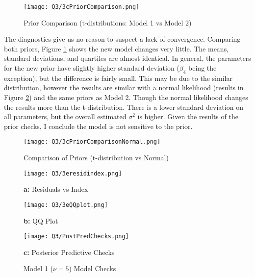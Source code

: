 \documentclass{article}
\begin{document}
\begin{figure}[!h]
\centering
\texttt{[image: Q3/3cPriorComparison.png]} \vspace{-5mm}
\caption{Prior Comparison (t-distributions: Model 1 vs Model 2)} \label{Fig3dPriorComp}
\end{figure}


The diagnostics give us no reason to suspect a lack of convergence. Comparing both priors, Figure \ref{Fig3dPriorComp} shows the new model changes very little. The means, standard deviations, and quartiles are almost identical. In general, the parameters for the new prior have slightly higher standard deviation ($\beta_4$ being the exception), but the difference is fairly small. This may be due to the similar distribution, however the results are similar with a normal likelihood (results in Figure \ref{Fig3dPriorComp2}) and the same priors as Model 2. Though the normal likelihood changes the results more than the t-distribution. There is a lower standard deviation on all parameters, but the overall estimated $\sigma^2$ is higher. Given the results of the prior checks, I conclude the model is not sensitive to the prior. 

\begin{figure}[!h]
\centering
\texttt{[image: Q3/3cPriorComparisonNormal.png]}
\caption{Comparison of Priors (t-distribution vs Normal)} \label{Fig3dPriorComp2}
\end{figure}



\begin{figure}[!h]
    \begin{minipage}[l]{0.5\textwidth}
        \texttt{[image: Q3/3eresidindex.png]}
        \centerline{\textbf{a:} Residuals vs Index}
    \end{minipage}
    \begin{minipage}[pos=r]{0.5\textwidth}
        \texttt{[image: Q3/3eQQplot.png]}
        \centerline{\textbf{b:} QQ Plot}
    \end{minipage}
    
    
    \begin{minipage}[pos=l]{\textwidth}
        \texttt{[image: Q3/PostPredChecks.png]}
        \centerline{\textbf{c:} Posterior Predictive Checks}
    \end{minipage}

        
\caption{Model 1 ($\nu = 5$) Model Checks} \label{Fig3d}
\end{figure}
\end{document}
